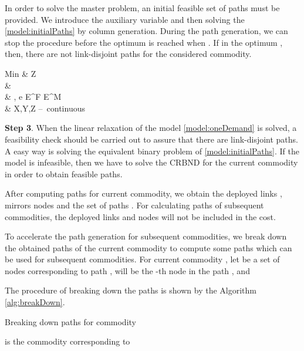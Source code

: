 \documentclass[onecolumn,11pt,draftclsnofoot]{IEEEtran}
\begin{document}
In order to solve the master problem, an initial feasible set of paths must be provided. We introduce the auxiliary variable  and then solving the \eqref{model:initialPaths} by column generation. During the path generation, we can stop the procedure before the optimum is reached when . If in the optimum ,  then, there are not  link-disjoint paths for the considered commodity. 

\mbox{Min} \;\; & Z \label{eq:initialPaths-1}\\
& \mbox{} \label{eq:initialPaths-2}\\
& \mbox{}, \; e \in \mathcal E^F \cup \mathcal E^M  \label{eq:initialPaths-3}\\
& X,Y,Z \mbox{-- continuous} \nonumber


\textbf{Step 3}. When the linear relaxation of the model \eqref{model:oneDemand} is solved, a feasibility check should be carried out to assure that there are  link-disjoint paths. A easy way is solving the equivalent binary problem of \eqref{model:initialPaths}. If the model is infeasible, then we have to solve the CRBND for the current commodity in order to obtain feasible paths.


After computing paths for current commodity, we obtain the deployed links , mirrors nodes  and the set of paths . For calculating paths of subsequent commodities, the deployed links and nodes will not be included in the cost.

To accelerate the path generation for subsequent commodities, we break down the obtained paths of the current commodity to compute some paths which can be used for subsequent commodities.
For current commodity , let  be a set of nodes corresponding to path ,  will be the -th node in the path , and 


The procedure of breaking down the paths is shown by the Algorithm \ref{alg:breakDown}.

\begin{algorithm}
\caption{Breaking down paths for commodity }
\label{alg:breakDown}
\begin{algorithmic}[1]
\REQUIRE 
	\FORALL{}
        \FOR{}
            \FOR{}
                \IF{}
                    \STATE  is the commodity corresponding to 
                    \IF {}
                        \STATE  
                        \STATE 
                    \ENDIF
                \ENDIF
            \ENDFOR
        \ENDFOR
    \ENDFOR
\end{algorithmic}
\end{algorithm}
\end{document}

